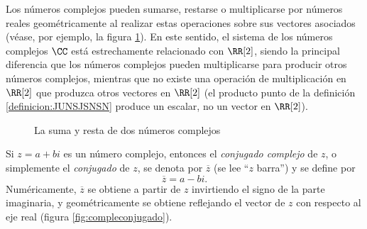 Los números complejos pueden sumarse, restarse o multiplicarse por números reales geométricamente al realizar estas operaciones sobre sus vectores asociados (véase, por ejemplo, la figura \ref{fig:sumayrestacomplejos}). En este sentido, el sistema de los números complejos $\CC$ está estrechamente relacionado con $\RR[2]$, siendo la principal diferencia que los números complejos pueden multiplicarse para producir otros números complejos, mientras que no existe una operación de multiplicación en $\RR[2]$ que produzca otros vectores en $\RR[2]$ (el producto punto de la definición \ref{definicion:JUNSJSNSN} produce un escalar, no un vector en $\RR[2]$).
\begin{figure}[h!]
    \centering
     \hfill
    \caption{La suma y resta de dos números complejos}
    \label{fig:sumayrestacomplejos}
\end{figure}

Si $z = a + bi$ es un número complejo, entonces el \emph{conjugado complejo} de $z$, o simplemente el \emph{conjugado} de $z$, se denota por $\overline{z}$ (se lee “$z$ barra”) y se define por
$$\overline{z} = a - bi.$$
Numéricamente, $\overline{z}$ se obtiene a partir de $z$ invirtiendo el signo de la parte imaginaria, y geométricamente se obtiene reflejando el vector de $z$ con respecto al eje real (figura \ref{fig:compleconjugado}).

